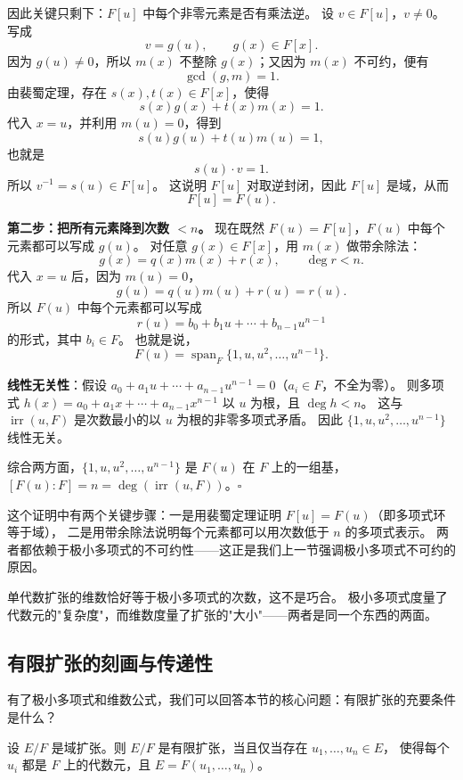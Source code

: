 因此关键只剩下：$F[u]$ 中每个非零元素是否有乘法逆。
设 $v\in F[u]$，$v\neq0$。写成
\[
v=g(u),\qquad g(x)\in F[x].
\]
因为 $g(u)\neq0$，所以 $m(x)$ 不整除 $g(x)$；又因为 $m(x)$ 不可约，便有
\[
\gcd(g,m)=1.
\]
由裴蜀定理，存在 $s(x),t(x)\in F[x]$，使得
\[
s(x)g(x)+t(x)m(x)=1.
\]
代入 $x=u$，并利用 $m(u)=0$，得到
\[
s(u)g(u)+t(u)m(u)=1,
\]
也就是
\[
s(u)\cdot v=1.
\]
所以 $v^{-1}=s(u)\in F[u]$。
这说明 $F[u]$ 对取逆封闭，因此 $F[u]$ 是域，从而
\[
F[u]=F(u).
\]

\textbf{第二步：把所有元素降到次数 $<n$。}
现在既然 $F(u)=F[u]$，$F(u)$ 中每个元素都可以写成 $g(u)$。
对任意 $g(x)\in F[x]$，用 $m(x)$ 做带余除法：
\[
g(x)=q(x)m(x)+r(x),\qquad \deg r<n.
\]
代入 $x=u$ 后，因为 $m(u)=0$，
\[
g(u)=q(u)m(u)+r(u)=r(u).
\]
所以 $F(u)$ 中每个元素都可以写成
\[
r(u)=b_0+b_1u+\cdots+b_{n-1}u^{n-1}
\]
的形式，其中 $b_i\in F$。
也就是说，
\[
F(u)=\operatorname{span}_F\{1,u,u^2,\ldots,u^{n-1}\}.
\]

\textbf{线性无关性}：假设 $a_0 + a_1 u + \cdots + a_{n-1} u^{n-1} = 0$（$a_i \in F$，不全为零）。
则多项式 $h(x) = a_0 + a_1 x + \cdots + a_{n-1} x^{n-1}$ 以 $u$ 为根，且 $\deg h < n$。
这与 $\operatorname{irr}(u, F)$ 是次数最小的以 $u$ 为根的非零多项式矛盾。
因此 $\{1, u, u^2, \ldots, u^{n-1}\}$ 线性无关。

综合两方面，$\{1, u, u^2, \ldots, u^{n-1}\}$ 是 $F(u)$ 在 $F$ 上的一组基，$[F(u):F] = n = \deg(\operatorname{irr}(u, F))$。$\square$

这个证明中有两个关键步骤：一是用裴蜀定理证明 $F[u] = F(u)$（即多项式环等于域），
二是用带余除法说明每个元素都可以用次数低于 $n$ 的多项式表示。
两者都依赖于极小多项式的不可约性——这正是我们上一节强调极小多项式不可约的原因。

单代数扩张的维数恰好等于极小多项式的次数，这不是巧合。
极小多项式度量了代数元的"复杂度"，而维数度量了扩张的"大小"——两者是同一个东西的两面。

\subsection{有限扩张的刻画与传递性}

有了极小多项式和维数公式，我们可以回答本节的核心问题：有限扩张的充要条件是什么？

\begin{theorem}[有限扩张的刻画]\label{thm:finite-extension-characterization}
设 $E/F$ 是域扩张。则 $E/F$ 是有限扩张，当且仅当存在 $u_1, \ldots, u_n \in E$，
使得每个 $u_i$ 都是 $F$ 上的代数元，且 $E = F(u_1, \ldots, u_n)$。
\end{theorem}

